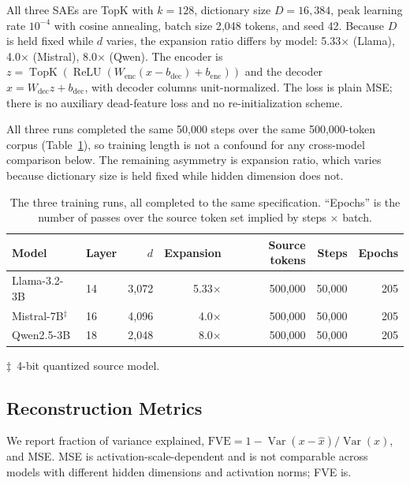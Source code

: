 \documentclass[11pt]{article}
\begin{document}
All three SAEs are TopK with $k = 128$, dictionary size $D = 16{,}384$, peak learning
rate $10^{-4}$ with cosine annealing, batch size 2{,}048 tokens, and seed 42. Because
$D$ is held fixed while $d$ varies, the expansion ratio differs by model: 5.33$\times$
(Llama), 4.0$\times$ (Mistral), 8.0$\times$ (Qwen). The encoder is
$z = \operatorname{TopK}(\operatorname{ReLU}(W_{\text{enc}}(x - b_{\text{dec}})
+ b_{\text{enc}}))$ and the decoder $\hat{x} = W_{\text{dec}} z + b_{\text{dec}}$, with
decoder columns unit-normalized. The loss is plain MSE; there is no auxiliary
dead-feature loss and no re-initialization scheme.

All three runs completed the same 50{,}000 steps over the same 500{,}000-token corpus
(Table~\ref{tab:runs}), so training length is not a confound for any cross-model
comparison below. The remaining asymmetry is expansion ratio, which varies because
dictionary size is held fixed while hidden dimension does not.

\begin{table}[t]
  \centering
  \caption{The three training runs, all completed to the same specification.
    ``Epochs'' is the number of passes over the source token set implied by
    steps $\times$ batch.}
  \label{tab:runs}
  \smallskip
  \begin{tabular}{llrrrrr}
    \toprule
    Model & Layer & $d$ & Expansion & Source tokens & Steps & Epochs \\
    \midrule
    Llama-3.2-3B      & 14 & 3{,}072 & 5.33$\times$ & 500{,}000 & 50{,}000 & 205 \\
    Mistral-7B$^\ddagger$ & 16 & 4{,}096 & 4.0$\times$  & 500{,}000 & 50{,}000 & 205 \\
    Qwen2.5-3B        & 18 & 2{,}048 & 8.0$\times$  & 500{,}000 & 50{,}000 & 205 \\
    \bottomrule
  \end{tabular}

  \smallskip
  \noindent\footnotesize $\ddagger$~4-bit quantized source model.
\end{table}

\subsection{Reconstruction Metrics}

We report fraction of variance explained,
$\text{FVE} = 1 - \operatorname{Var}(x - \hat{x}) / \operatorname{Var}(x)$, and MSE.
MSE is activation-scale-dependent and is not comparable across models with different
hidden dimensions and activation norms; FVE is.
\end{document}
